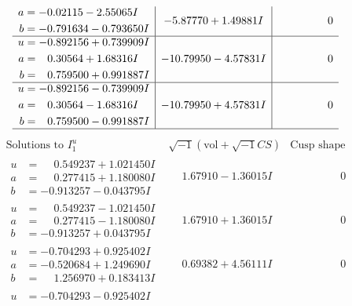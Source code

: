 \documentclass[1p]{elsarticle_modified}
\theoremstyle{definition}
\newcommand{\I}{\sqrt{-1}}
\begin{document}
$$\begin{array}{c|c|c}
\begin{aligned}
a &= -0.02115 - 2.55065 I \\
b &= -0.791634 - 0.793650 I\end{aligned}
 & -5.87770 + 1.49881 I & \phantom{-0.000000 } 0 \\ \hline\begin{aligned}
u &= -0.892156 + 0.739909 I \\
a &= \phantom{-}0.30564 + 1.68316 I \\
b &= \phantom{-}0.759500 + 0.991887 I\end{aligned}
 & -10.79950 - 4.57831 I & \phantom{-0.000000 } 0 \\ \hline\begin{aligned}
u &= -0.892156 - 0.739909 I \\
a &= \phantom{-}0.30564 - 1.68316 I \\
b &= \phantom{-}0.759500 - 0.991887 I\end{aligned}
 & -10.79950 + 4.57831 I & \phantom{-0.000000 } 0\\
 \hline 
 \end{array}$$\newpage$$\begin{array}{c|c|c}  
\text{Solutions to }I^u_{1}& \I (\text{vol} + \sqrt{-1}CS) & \text{Cusp shape}\\
 \hline 
\begin{aligned}
u &= \phantom{-}0.549237 + 1.021450 I \\
a &= \phantom{-}0.277415 + 1.180080 I \\
b &= -0.913257 - 0.043795 I\end{aligned}
 & \phantom{-}1.67910 - 1.36015 I & \phantom{-0.000000 } 0 \\ \hline\begin{aligned}
u &= \phantom{-}0.549237 - 1.021450 I \\
a &= \phantom{-}0.277415 - 1.180080 I \\
b &= -0.913257 + 0.043795 I\end{aligned}
 & \phantom{-}1.67910 + 1.36015 I & \phantom{-0.000000 } 0 \\ \hline\begin{aligned}
u &= -0.704293 + 0.925402 I \\
a &= -0.520684 + 1.249690 I \\
b &= \phantom{-}1.256970 + 0.183413 I\end{aligned}
 & \phantom{-}0.69382 + 4.56111 I & \phantom{-0.000000 } 0 \\ \hline\begin{aligned}
u &= -0.704293 - 0.925402 I \\

\end{aligned}
\end{array}$$
\end{document}
